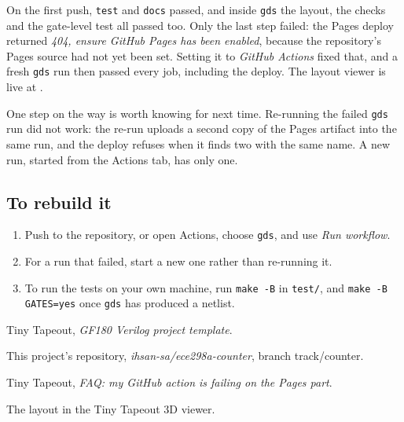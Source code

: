 \documentclass[11pt]{article}
\begin{document}
On the first push, \texttt{test} and \texttt{docs} passed, and inside \texttt{gds} the layout,
the checks and the gate-level test all passed too. Only the last step failed: the Pages deploy
returned \textit{404, ensure GitHub Pages has been enabled}, because the repository's Pages
source had not yet been set. Setting it to \textit{GitHub Actions} fixed that, and a fresh
\texttt{gds} run then passed every job, including the deploy. The layout viewer is live at
.

One step on the way is worth knowing for next time. Re-running the failed \texttt{gds} run did
not work: the re-run uploads a second copy of the Pages artifact into the same run, and the
deploy refuses when it finds two with the same name. A new run, started from the Actions tab,
has only one.

\subsection{To rebuild it}
\begin{enumerate}
\item Push to the repository, or open Actions, choose \texttt{gds}, and use \textit{Run workflow}.
\item For a run that failed, start a new one rather than re-running it.
\item To run the tests on your own machine, run \texttt{make -B} in \texttt{test/}, and
  \texttt{make -B GATES=yes} once \texttt{gds} has produced a netlist.
\end{enumerate}

\hssourcespage
\begin{hssources}
\item Tiny Tapeout, \emph{GF180 Verilog project template}. 
\item This project's repository, \emph{ihsan-sa/ece298a-counter}, branch track/counter. 
\item Tiny Tapeout, \emph{FAQ: my GitHub action is failing on the Pages part}. 
\item The layout in the Tiny Tapeout 3D viewer. 
\end{hssources}
\end{document}
